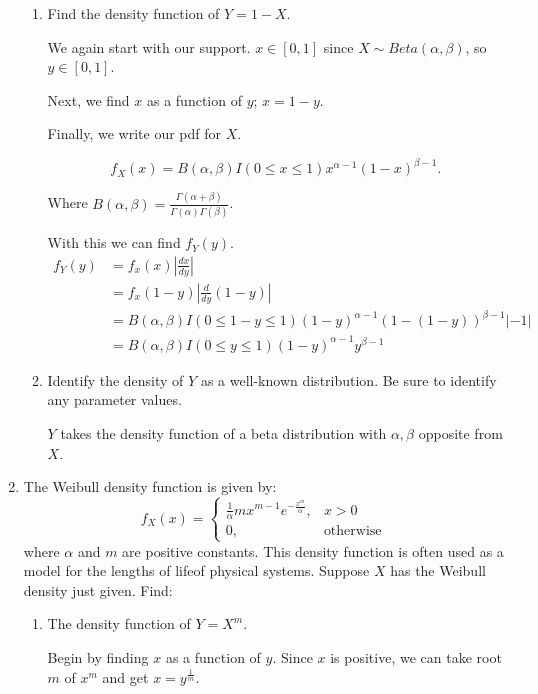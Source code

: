 \documentclass{article}
\begin{document}
\begin{enumerate}
\begin{enumerate}[label= (\alph*)] 
\item Find the density function of $Y = 1 - X$.

    We again start with our support. $x\in [0,1]$ since $X\sim Beta(\alpha,\beta)$,
    so $y\in [0,1]$.

    Next, we find $x$ as a function of $y$; $x=1-y$.

    Finally, we write our pdf for $X$.

    \[
    f_X(x)=B(\alpha,\beta)I(0\leq x\leq 1)x^{\alpha-1}(1-x)^{\beta-1}
    .\] 

    Where $B(\alpha,\beta)=\frac{\Gamma(\alpha+\beta)}{\Gamma(\alpha)\Gamma(\beta)}$.

    With this we can find $f_Y(y)$.
    \begin{align*}
        f_Y(y)&= f_x(x)\left|\frac{dx}{dy}\right| \\
        &= f_x(1-y)\left|\frac{d}{dy}(1-y)\right| \\
        &= B(\alpha,\beta)I(0\leq 1-y\leq 1)(1-y)^{\alpha-1}(1-(1-y))^{\beta-1}
        \left|-1\right| \\
        &= B(\alpha,\beta)I(0\leq y\leq 1)(1-y)^{\alpha-1}y^{\beta-1}
    \end{align*}


\item  Identify the density of $Y$ as a well-known distribution. Be sure to identify any parameter values.

    $Y$ takes the density function of a beta distribution with $\alpha,\beta$ 
    opposite from $X$.

\end{enumerate}
\item The Weibull density function is given by:
\[
f_X(x)=\begin{cases}\frac{1}{\alpha}mx^{m-1}e^{-\frac{x^m}{\alpha}},&x>0\\0,&\text{otherwise}\end{cases}
\] 
where $\alpha$ and $m$ are positive constants. This density function is often used as a model for the lengths of lifeof physical systems.
Suppose $X$ has the Weibull density just given. Find:
\begin{enumerate}[label= (\alph*)] 
\item The density function of $Y = X^m$.

    Begin by finding $x$ as a function of $y$. Since $x$ is positive, we can take root $m$
    of $x^{m}$ and get $x=y^{\frac{1}{m}}$. 


\end{enumerate}
\end{enumerate}
\end{document}
